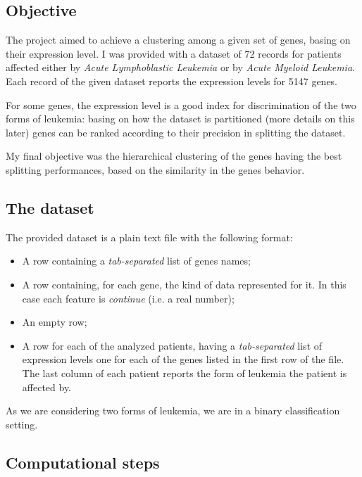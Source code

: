 \subsection{ Objective }

    The project aimed to achieve a clustering among a given set of genes,
    basing on their expression level. I was provided with a dataset of 72
    records for patients affected either by \emph{Acute Lymphoblastic
    Leukemia} or by \emph{Acute Myeloid Leukemia}. Each record of the
    given dataset reports the expression levels for 5147 genes.

    For some genes, the expression level is a good index for
    discrimination of the two forms of leukemia: basing on how the dataset
    is partitioned (more details on this later) genes can be ranked
    according to their precision in splitting the dataset.

    My final objective was the hierarchical clustering of the genes having
    the best splitting performances, based on the similarity in the genes
    behavior.

\subsection{ The dataset }

    The provided dataset is a plain text file with the following format:
    \begin{itemize}
    \item   A row containing a \emph{tab-separated} list of genes names;
    \item   A row containing, for each gene, the kind of data represented
            for it. In this case each feature is \emph{continue} (i.e. a
            real number);
    \item   An empty row;
    \item   A row for each of the analyzed patients,
            having a \emph{tab-separated} list of expression levels one
            for each of the genes listed in the first row of the
            file. The last column of each patient reports the form of
            leukemia the patient is affected by.
    \end{itemize}

    As we are considering two forms of leukemia, we are in a binary
    classification setting.

\subsection{ Computational steps }


